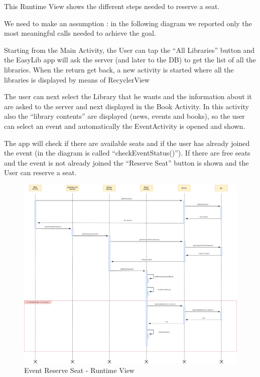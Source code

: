 \newpage
\vspace*{0cm}
This Runtime View shows the different steps needed to reserve a seat. \par
We need to make an assumption : in the following diagram we reported only the most meaningful calls needed to achieve the goal. \par
Starting from the Main Activity, the User can tap the “All Libraries” button and the EasyLib app will ask the server (and later to the DB) to get the list of all the libraries. When the return get back, a new activity is started where all the libraries is displayed by means of RecyclerView\par
The user can next select the Library that he wants and the information about it are asked to the server and next displayed in the Book Activity. In this activity also the “library contents” are displayed (news, events and books), so the user can select an event and automatically the EventActivity is opened and shown.\par
The app will check if there are available seats and if the user has already joined the event (in the diagram is called “checkEventStatus()”). If there are free seats and the event is not already joined the “Reserve Seat” button is shown and the User can reserve a seat.
\newpage
\vspace*{0cm}
\begin{figure}[H]
	\centering
	\includegraphics[scale=0.22]{Images/Runtime/event_reserve_seat}
	\caption{Event Reserve Seat - Runtime View}
\end{figure}

